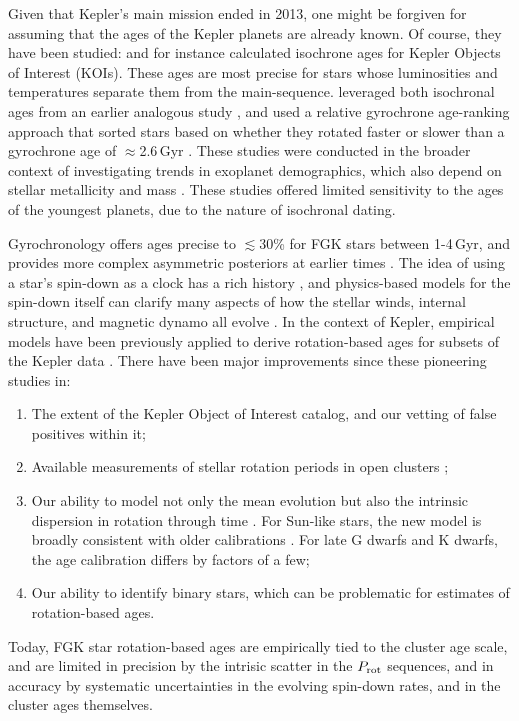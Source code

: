 \documentclass[11pt,twocolumn,tighten]{aastex63}
\begin{document}
Given that Kepler's main mission ended in 2013, one might be
forgiven for assuming that the ages of the Kepler planets are already
known.  Of course, they have been studied: \citet{Berger_2020b_rpage}
and \citet{Petigura_2022} for instance calculated isochrone ages for
Kepler Objects of Interest (KOIs).  These ages are most precise for
stars whose luminosities and temperatures separate them from the
main-sequence.  \citet{David_2021} leveraged both isochronal ages from
an earlier analogous study \citep{Fulton_2018}, and
used a relative gyrochrone age-ranking approach that sorted stars
based on whether they rotated faster or slower than a gyrochrone age
of $\approx$2.6\,Gyr \citep{Meibom_2015,Curtis_2020}.  These studies
were conducted in the broader context of investigating trends in
exoplanet demographics, which also depend on stellar metallicity and
mass \citep[e.g.][]{Petigura_2018}.  These studies offered limited
sensitivity to the ages of the youngest planets, due to the nature of
isochronal dating.

Gyrochronology offers ages precise to $\lesssim$30\% for FGK stars
between 1-4\,Gyr, and provides more complex asymmetric posteriors at earlier
times \citep{Bouma_2023}.  The idea of using a star's spin-down as a
clock has a rich history
\citep{Skumanich_1972,Noyes_1984,Kawaler_1989,Barnes03,Mamajek_2008,Angus_2015},
and physics-based models for the spin-down itself can clarify many
aspects of how the stellar winds, internal structure, and magnetic
dynamo all evolve
\citep[e.g.][]{Matt_2015,Gallet_Bouvier_2015,Spada_2020}.  In the
context of Kepler, empirical models have been previously applied to
derive rotation-based ages for subsets of the Kepler data
\citep{Walkowicz_2013,Reinhold_2015,Angus_2018}.  There have been
major improvements since these pioneering studies in:
\begin{enumerate}[label={\it \roman*)},leftmargin=*,topsep=0pt,itemsep=-1ex,partopsep=1ex,parsep=1ex]
  \item The extent of the Kepler Object of Interest catalog, and our vetting of false
    positives within it;
  \item Available measurements of stellar rotation periods
    in open clusters
    \citep[e.g.][]{Curtis_2019_ngc6811,Gillen_2020,Rampalli_2021,Fritzewski_2021,Rebull_2022,Dungee_2022,2023AJ....166...14B};
  \item Our ability to model not only the mean evolution but also the
    intrinsic dispersion in rotation through time
    \citep{Bouma_2023}.  For Sun-like stars, the new model is broadly
    consistent with older calibrations \citep[e.g.][]{Mamajek_2008}.
    For late G dwarfs and K dwarfs, the age calibration
    differs by factors of a few;
  \item Our ability to identify binary stars, which can be problematic
    for estimates of rotation-based ages.
\end{enumerate}
Today, FGK star rotation-based ages are
empirically tied to the cluster age scale, and
are limited in precision by the intrisic scatter in the $P_{\rm rot}$
sequences, and in accuracy by systematic uncertainties in the evolving
spin-down rates, and in the cluster ages themselves.  
\end{document}

